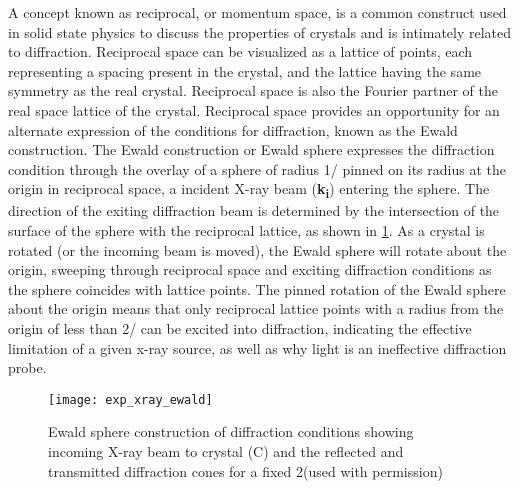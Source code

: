 A concept known as reciprocal, or momentum space, is a common construct used in solid state physics to discuss the properties of crystals and is intimately related to diffraction. Reciprocal space can be visualized as a lattice of points, each representing a spacing present in the crystal, and the lattice having the same symmetry as the real crystal. Reciprocal space is also the Fourier partner of the real space lattice of the crystal. Reciprocal space provides an opportunity for an alternate expression of the conditions for diffraction, known as the Ewald construction. The Ewald construction or Ewald sphere expresses the diffraction condition through the overlay of a sphere of radius 1/\textlambda{} pinned on its radius at the origin in reciprocal space, a incident X-ray beam (\textbf{k\textsubscript{i}}) entering the sphere. The direction of the exiting diffraction beam is determined by the intersection of the surface of the sphere with the reciprocal lattice, as shown in \cref{fig:exp_xray_ewald}. As a crystal is rotated (or the incoming beam is moved), the Ewald sphere will rotate about the origin, sweeping through reciprocal space and exciting diffraction conditions as the sphere coincides with lattice points. The pinned rotation of the Ewald sphere about the origin means that only reciprocal lattice points with a radius from the origin of less than 2/\textlambda{} can be excited into diffraction, indicating the effective limitation of a given x-ray source, as well as why light is an ineffective diffraction probe.
\begin{figure}
\centering
\texttt{[image: exp\_xray\_ewald]}
\caption[Ewald sphere]{\label{fig:exp_xray_ewald}Ewald sphere construction of diffraction conditions showing incoming X-ray beam to crystal (C) and the reflected and transmitted diffraction cones for a fixed 2\straighttheta{}\cite{He2009}(used with permission)}
\end{figure}

